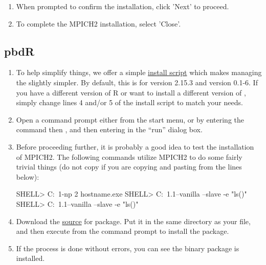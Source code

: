 \begin{enumerate}
  \item When prompted to confirm the installation, click 'Next' to proceed.
  \item To complete the MPICH2 installation, select 'Close'.
\end{enumerate}






\subsection{pbdR}
\begin{enumerate}
  \item To help simplify things, we offer a simple \href{https://github.com/wrathematics/installation-instructions/raw/master/windows/build_pbdMPI.bat}{install script} which makes managing the  slightly simpler.  By default, this is for  version 2.15.3 and  version 0.1-6.  If you have a different version of R or want to install a different version of , simply change lines 4 and/or 5 of the install script to match your needs.
  \item Open a command prompt either from the start menu, or by entering the command  then , and then entering  in the ``run'' dialog box.
  \item Before proceeding further, it is probably a good idea to test the installation of MPICH2.  The following commands utilize MPICH2 to do some fairly trivial things (do not copy  if you are copying and pasting from the lines below):
  \begin{Code}
SHELL> C:\PROGRA~1\bin\mpiexec -np 2 hostname.exe
SHELL> C:\PROGRA~1\R{}.1\bin\R --vanilla --slave -e "ls()"
SHELL> C:\PROGRA~1\R{}.1\bin\Rscript --vanilla --slave -e "ls()"
  \end{Code}
  \item Download the \href{http://cran.r-project.org/src/contrib/pbdMPI_0.1-6.tar.gz}{source} for \href{http://cran.r-project.org/web/packages/pbdMPI/index.html}{} package.  Put it in the same directory as your  file, and then execute  from the command prompt to install the package.
  \item If the process is done without errors, you can see the binary package is installed. 
\end{enumerate}




